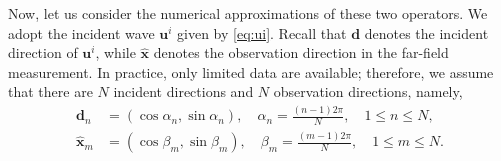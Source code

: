 \documentclass[11pt,reqno,twoside]{amsart}
\theoremstyle{definition}
\theoremstyle{remark}
\numberwithin{equation}{section}
\begin{document}
Now, let us consider the numerical approximations of these two operators. We adopt the incident wave $\mathbf u^i$ given by \eqref{eq:ui}. Recall that $ \mathbf d $ denotes the incident direction of $\mathbf{u}^i$, while $ \hat{\mathbf x} $ denotes the observation direction in the far-field measurement. In practice, only limited data are available; therefore, we assume that there are $ N $ incident directions and $ N $ observation directions, namely,
\begin{align}
\label{eq:incidentd}
\mathbf d_n &= \left( \cos \alpha_n, \sin \alpha_n \right), \quad \alpha_n = \frac{(n-1)2\pi}{N}, \quad 1 \leq n \leq N,\\
\label{eq:observationx}
\hat{\mathbf x}_m &= \left( \cos \beta_m, \sin \beta_m \right), \quad \beta_m = \frac{(m-1)2\pi}{N}, \quad 1 \leq m \leq N.
\end{align}
\end{document}
